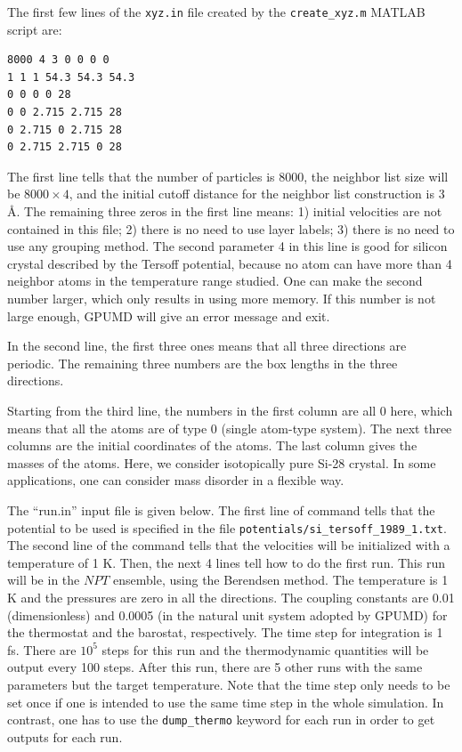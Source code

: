 \documentclass[12pt,a4paper]{report}
\begin{document}
The first few lines of the \verb"xyz.in" file created by the \verb"create_xyz.m" MATLAB script are:
\begin{verbatim}
8000 4 3 0 0 0 0
1 1 1 54.3 54.3 54.3
0 0 0 0 28
0 0 2.715 2.715 28
0 2.715 0 2.715 28
0 2.715 2.715 0 28
\end{verbatim}
The first line tells that the number of particles is 8000, the neighbor list size will be
$8000\times 4$, and the initial cutoff distance for the neighbor list construction is 3 \AA. The remaining three zeros in the first line means: 1) initial velocities are not contained in this file; 2) there is no need to use layer labels; 3) there is no need to use any grouping method. The second parameter 4 in this line is good for silicon crystal described by the Tersoff potential, because no atom can have more than 4 neighbor atoms in the temperature range studied. One can make the second number larger, which only results in using more memory. If this number is not large enough, GPUMD will give an error message and exit. 

In the second line, the first three ones means that all three directions are periodic. The remaining three numbers are the box lengths in the three directions. 

Starting from the third line, the numbers in the first column are all 0 here, which means that all the atoms are of type 0 (single atom-type system). The next three columns are the initial coordinates of the atoms. The last column gives the masses of the atoms. Here, we consider isotopically pure Si-28 crystal. In some applications, one can consider mass disorder in a flexible way.

The ``run.in'' input file is given below. The first line of command tells that the potential to be used is specified in the file \verb"potentials/si_tersoff_1989_1.txt".  The second line of the command tells that the velocities will be initialized with a temperature of 1 K. Then, the next 4 lines tell how to do the first run. This run will be in the $NPT$ ensemble, using the Berendsen method. The temperature is 1 K and the pressures are zero in all the directions. The coupling constants are 0.01 (dimensionless) and 0.0005 (in the natural unit system adopted by GPUMD) for the thermostat and the barostat, respectively. The time step for integration is 1 fs. There are $10^5$ steps for this run and the thermodynamic quantities will be output every 100 steps. After this run, there are 5 other runs with the same parameters but the target temperature. Note that the time step only needs to be set once if one is intended to use the same time step in the whole simulation. In contrast, one has to use the \verb"dump_thermo" keyword for each run in order to get outputs for each run.
\end{document}
